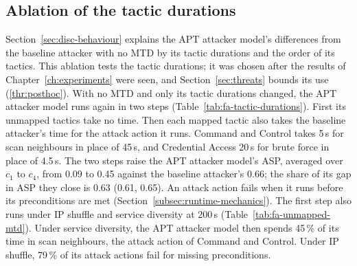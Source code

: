 \documentclass{cshonours}
\begin{document}


\subsection{Ablation of the tactic durations}
\label{app:further-analyses}\label{app:fa-run-time}
Section~\ref{sec:disc-behaviour} explains the APT attacker model's
differences from the baseline attacker with no MTD by its tactic durations
and the order of its tactics. This ablation tests the tactic durations; it was chosen
after the results of Chapter~\ref{ch:experiments} were seen, and
Section~\ref{sec:threats} bounds its use (\ref{thr:posthoc}). With no MTD and only its tactic durations
changed, the APT attacker model runs again in two steps (Table~\ref{tab:fa-tactic-durations}).
First its unmapped tactics take no time. Then each mapped tactic also takes
the baseline attacker's time for the attack action it runs. Command and
Control takes 5\,s for scan neighbours in place of 45\,s, and Credential Access
20\,s for brute force in place of 4.5\,s. The two steps raise the APT attacker
model's ASP, averaged over $c_1$ to $c_4$, from 0.09 to 0.45 against the
baseline attacker's 0.66; the share of its gap in ASP they close is
0.63 (0.61, 0.65). An attack action fails when it runs before its
preconditions are met (Section~\ref{subsec:runtime-mechanics}). The first step
also runs under IP shuffle and service diversity at 200\,s
(Table~\ref{tab:fa-unmapped-mtd}). Under service diversity, the APT attacker
model then spends 45\,\% of its time in scan neighbours, the attack action of
Command and Control. Under IP shuffle, 79\,\% of its attack actions fail
for missing preconditions.
\end{document}
